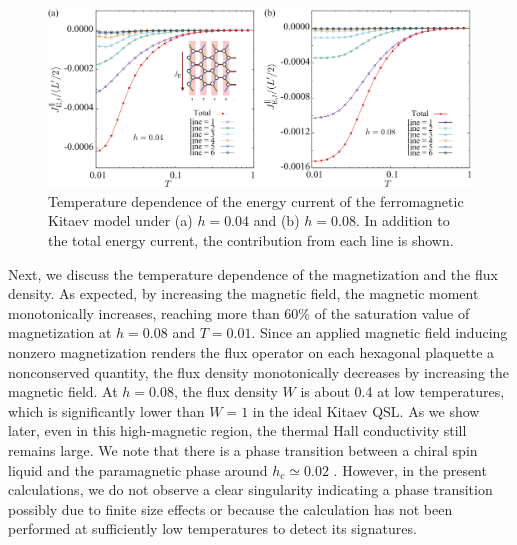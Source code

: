 \documentclass[twocolumn,superscriptaddress,showpacs, longbibliography, aps, prb]{revtex4-2}
\newcommand{\red}[1]{\textcolor{red}{#1}}
\newcommand{\blue}[1]{\textcolor{blue}{#1}}
\begin{document}


\begin{figure}[htb]
  \begin{center}
    \includegraphics[width=0.9\linewidth]{Figs/J_line_all.pdf}
  \end{center}
  \caption{Temperature dependence of the energy current of the ferromagnetic Kitaev model under (a) $h=0.04$ and (b) $h=0.08$. In addition to the total energy current, the contribution from each line is shown.}
  \label{fig:J_line}
\end{figure}

Next, we %
discuss the temperature dependence of the magnetization and the flux density. 
As expected, by increasing the magnetic field, 
the magnetic moment monotonically increases, %
reaching more than 60\% of the saturation value of magnetization at $h=0.08$ and $T=0.01$. 
Since an applied magnetic field inducing nonzero magnetization renders %
the flux operator on each hexagonal plaquette a nonconserved quantity, %
the flux density %
monotonically decreases by increasing the magnetic field.
At $h=0.08$, the flux density $W$ is about 0.4 at low temperatures, 
which is significantly %
lower than $W=1$ in the ideal Kitaev QSL.
As we show later, even %
in this high-magnetic region,
the thermal Hall conductivity still remains large.
We note that there is a phase transition between a %
chiral spin liquid and the paramagnetic phase around $h_c \simeq 0.02$ \cite{ZhuKSF2018,LeeKCOYKK2020}. 
However, in the present calculations, 
we do not observe a clear singularity indicating %
a phase transition possibly due to finite size effects or because the calculation has not been 
performed at %
sufficiently low temperatures to %
detect its signatures.
\end{document}
